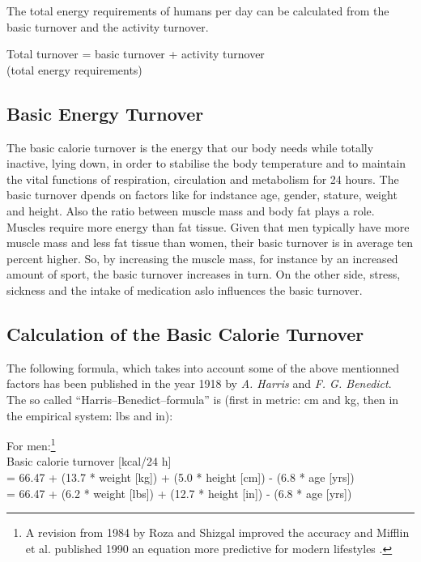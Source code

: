 \documentclass[../main.tex]{subfiles}
\begin{document}
The total energy requirements of humans per day can be calculated from the basic turnover and the activity turnover.

\vspace{2mm}

\begin{center}
\begin{fminipage}{8cm}
  Total turnover  = basic turnover + activity turnover \\
  (total energy requirements)
\end{fminipage}
\end{center}

\vspace{2mm}

\subsection{Basic Energy Turnover}

The basic calorie turnover is the energy that our body needs while totally inactive, lying down, in order to
stabilise the body temperature and to maintain the vital functions of respiration, circulation and metabolism for 24 hours.
The basic turnover dpends on factors like for indstance age, gender, stature, weight and height.
Also the ratio between muscle mass and body fat plays a role.
Muscles require more energy than fat tissue.
Given that men typically have more muscle mass and less fat tissue than women, their basic turnover is in average ten percent higher.
So, by increasing the muscle mass, for instance by an increased amount of sport, the basic turnover increases in turn.
On the other side, stress, sickness and the intake of medication aslo influences the basic turnover.


\subsection{Calculation of the Basic Calorie Turnover}

The following formula, which takes into account some of the above mentionned factors has been published in the year 1918
by \textit{A. Harris} and \textit{F. G. Benedict}.
The so called ``Harris--Benedict--formula'' is (first in metric: cm and kg, then in the empirical system: lbs and in):

\noindent For men:\footnote{A revision from 1984 by {Roza} and {Shizgal} improved the accuracy and {Mifflin et al.}
 published 1990 an equation more predictive for modern lifestyles \cite{WikiCalorie}.}\\
Basic calorie turnover [kcal/24 h] \\
= 66.47 + (13.7 * weight [kg]) + (5.0 * height [cm]) - (6.8 * age [yrs]) \\
= 66.47 + (6.2 * weight [lbs]) + (12.7 * height [in]) - (6.8 * age [yrs])
\end{document}
